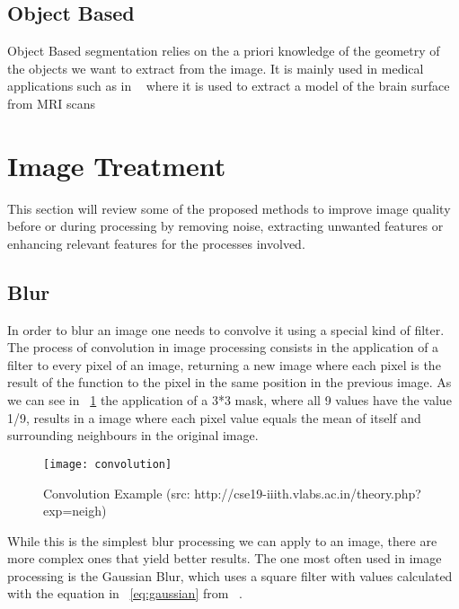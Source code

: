 \subsection{Object Based}

Object Based segmentation relies on the a priori knowledge of the geometry of the objects we want to extract from the image. It is mainly used in medical applications such as in ~\cite{snell_model-based_1993} where it is used to extract a model of the brain surface from MRI scans 

\section{Image Treatment}

This section will review some of the proposed methods to improve image quality before or during processing by removing noise, extracting unwanted features or enhancing relevant features for the processes involved.

\subsection{Blur}

In order to blur an image one needs to convolve it using a special kind of filter. The process of convolution in image processing consists in the application of a filter to every pixel of an image, returning a new image where each pixel is the result of the function to the pixel in the same position in the previous image. As we can see in ~\ref{fig:convolution} the application of a 3*3 mask, where all 9 values have the value 1/9, results in a image where each pixel value equals the mean of itself and surrounding neighbours in the original image.

\begin{figure}[h]
  \begin{center}
    \leavevmode
    \texttt{[image: convolution]}
    \caption{Convolution Example (src: http://cse19-iiith.vlabs.ac.in/theory.php?exp=neigh)}
    \label{fig:convolution}
  \end{center}
\end{figure}

While this is the simplest blur processing we can apply to an image, there are more complex ones that yield better results. The one most often used in image processing is the Gaussian Blur, which uses a square filter with values calculated with the equation in ~\ref{eq:gaussian} from ~\cite{shapiro_computer_2001}.

